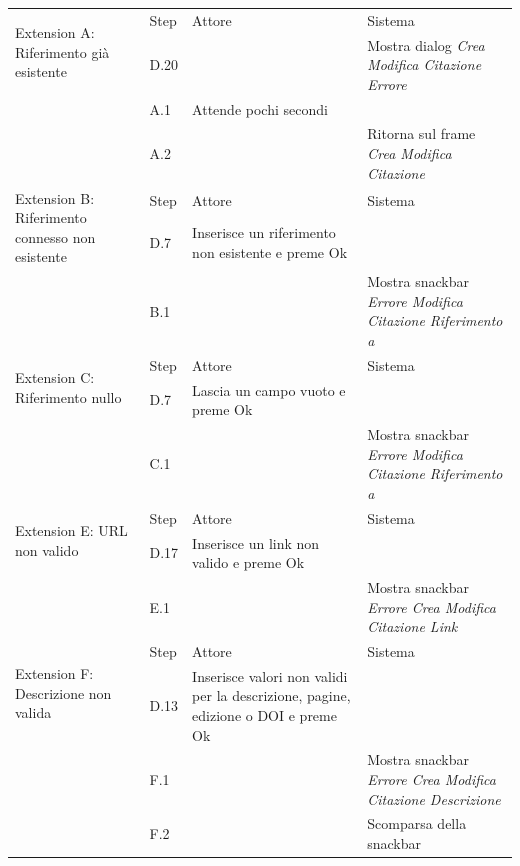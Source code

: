 \newpage

\begin{table}[H]
  \def\arraystretch{1.1}
  \begin{tabularx}{\linewidth}{|l|X|X|X|}
      
 \hline \multirow{2}{*}{Extension A: Riferimento già esistente} & Step &
  Attore & Sistema \\
 \cline{2-4} &  D.20 & & Mostra dialog \textit{Crea Modifica Citazione Errore} \\
 \cline{2-4} & A.1 & Attende pochi secondi & \\
\cline{2-4} & A.2 & & Ritorna sul frame \textit{Crea Modifica Citazione} \\
 \hline
 
  \multirow{2}{*}{Extension B: Riferimento connesso non esistente} & Step & Attore & Sistema \\
  \cline{2-4} & D.7 & Inserisce un riferimento non esistente e preme Ok & \\
  \cline{2-4} & B.1 & & Mostra snackbar \textit{Errore Modifica Citazione Riferimento a} \\

 \hline
 
  \multirow{2}{*}{Extension C: Riferimento nullo} & Step & Attore & Sistema \\
  \cline{2-4} & D.7 & Lascia un campo vuoto e preme Ok & \\
  \cline{2-4} & C.1 & & Mostra snackbar \textit{Errore Modifica Citazione Riferimento a} \\

 \hline
 
  \multirow{2}{*}{Extension E: URL non valido} & Step & Attore & Sistema \\
  \cline{2-4} & D.17 & Inserisce un link non valido e preme Ok & \\
  \cline{2-4} & E.1 & & Mostra snackbar \textit{Errore Crea Modifica Citazione Link} \\

 \hline
 
  \multirow{2}{*}{Extension F: Descrizione non valida} & Step & Attore & Sistema \\
  \cline{2-4} & D.13 & Inserisce valori non validi per la descrizione, pagine, edizione o DOI e preme Ok & \\
  \cline{2-4} & F.1 & & Mostra snackbar \textit{Errore Crea Modifica Citazione Descrizione} \\
  \cline{2-4} & F.2 & & Scomparsa della snackbar \\


\end{tabularx}
\end{table}
